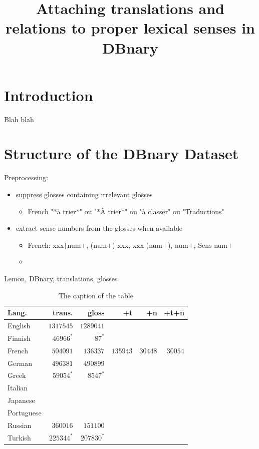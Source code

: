 \documentclass[10pt, a4paper]{article}
\title{Attaching translations and relations to proper lexical senses in DBnary}
\begin{document}
\maketitleabstract

\section{Introduction}
Blah blah

\section{Structure of the DBnary Dataset}

Preprocessing:

\begin{itemize}
   \item suppress glosses containing irrelevant glosses
   \begin{itemize}
      \item French "*à trier*" ou "*À trier*" ou "à classer" ou "Traductions"
   \end{itemize}
   \item extract sense numbers from the glosses when available
   \begin{itemize}
      \item French: xxx\texttt{|}num+, (num+) xxx, xxx (num+), num+, Sens num+
      \item 
   \end{itemize}
\end{itemize}
Lemon, DBnary, translations, glosses

\begin{table}[h]
\begin{center}\begin{footnotesize}
\begin{tabular}{lrrrrr}
\textbf{Lang.} & \textbf{trans.} & \textbf{gloss} & \textbf{+t} &  \textbf{+n} & \textbf{+t+n}\\
\hline
English & $1317545$ & $1289041$ \\
Finnish & $46966^*$ & $87^*$ \\
French & $504091$ & $136337$ & $135943$ & $30448$ & $30054$ \\
German & $496381$ & $490899$ \\
Greek & $59054^*$ & $8547^*$ \\
Italian & & \\
Japanese & & \\
Portuguese & & \\
Russian & $360016$ & $151100$ \\
Turkish & $225344^*$ & $207830^*$\\
\hline
\end{tabular}
\caption{The caption of the table}
\end{footnotesize}\end{center}
\end{table}
\end{document}
